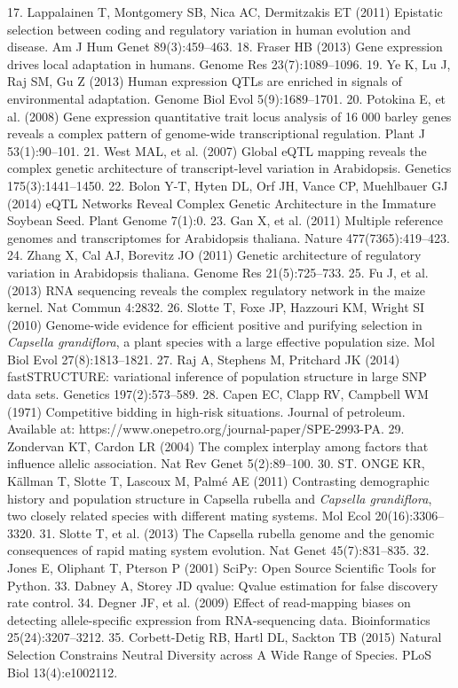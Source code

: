 17. 	Lappalainen T, Montgomery SB, Nica AC, Dermitzakis ET (2011) Epistatic selection between coding and regulatory variation in human evolution and disease. Am J Hum Genet 89(3):459–463.
18. 	Fraser HB (2013) Gene expression drives local adaptation in humans. Genome Res 23(7):1089–1096.
19. 	Ye K, Lu J, Raj SM, Gu Z (2013) Human expression QTLs are enriched in signals of environmental adaptation. Genome Biol Evol 5(9):1689–1701.
20. 	Potokina E, et al. (2008) Gene expression quantitative trait locus analysis of 16 000 barley genes reveals a complex pattern of genome-wide transcriptional regulation. Plant J 53(1):90–101.
21. 	West MAL, et al. (2007) Global eQTL mapping reveals the complex genetic architecture of transcript-level variation in Arabidopsis. Genetics 175(3):1441–1450.
22. 	Bolon Y-T, Hyten DL, Orf JH, Vance CP, Muehlbauer GJ (2014) eQTL Networks Reveal Complex Genetic Architecture in the Immature Soybean Seed. Plant Genome 7(1):0.
23. 	Gan X, et al. (2011) Multiple reference genomes and transcriptomes for Arabidopsis thaliana. Nature 477(7365):419–423.
24. 	Zhang X, Cal AJ, Borevitz JO (2011) Genetic architecture of regulatory variation in Arabidopsis thaliana. Genome Res 21(5):725–733.
25. 	Fu J, et al. (2013) RNA sequencing reveals the complex regulatory network in the maize kernel. Nat Commun 4:2832.
26. 	Slotte T, Foxe JP, Hazzouri KM, Wright SI (2010) Genome-wide evidence for efficient positive and purifying selection in \textit{Capsella grandiflora}, a plant species with a large effective population size. Mol Biol Evol 27(8):1813–1821.
27. 	Raj A, Stephens M, Pritchard JK (2014) fastSTRUCTURE: variational inference of population structure in large SNP data sets. Genetics 197(2):573–589.
28. 	Capen EC, Clapp RV, Campbell WM (1971) Competitive bidding in high-risk situations. Journal of petroleum. Available at: https://www.onepetro.org/journal-paper/SPE-2993-PA.
29. 	Zondervan KT, Cardon LR (2004) The complex interplay among factors that influence allelic association. Nat Rev Genet 5(2):89–100.
30. 	ST. ONGE KR, Källman T, Slotte T, Lascoux M, Palmé AE (2011) Contrasting demographic history and population structure in Capsella rubella and \textit{Capsella grandiflora}, two closely related species with different mating systems. Mol Ecol 20(16):3306–3320.
31. 	Slotte T, et al. (2013) The Capsella rubella genome and the genomic consequences of rapid mating system evolution. Nat Genet 45(7):831–835.
32. 	Jones E, Oliphant T, Pterson P (2001) SciPy: Open Source Scientific Tools for Python.
33. 	Dabney A, Storey JD qvalue: Qvalue estimation for false discovery rate control.
34. 	Degner JF, et al. (2009) Effect of read-mapping biases on detecting allele-specific expression from RNA-sequencing data. Bioinformatics 25(24):3207–3212.
35. 	Corbett-Detig RB, Hartl DL, Sackton TB (2015) Natural Selection Constrains Neutral Diversity across A Wide Range of Species. PLoS Biol 13(4):e1002112.

